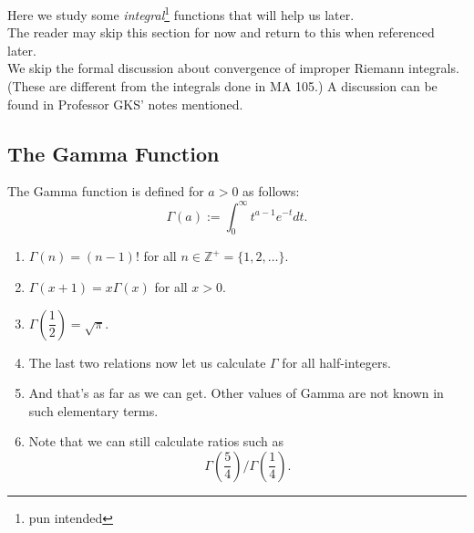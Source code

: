Here we study some \emph{integral}\footnote{pun intended} functions that will help us later.\\
The reader may skip this section for now and return to this when referenced later.\\
We skip the formal discussion about convergence of improper Riemann integrals. (These are different from the integrals done in MA 105.) A discussion can be found in Professor GKS' notes mentioned.
\subsection{The Gamma Function}
\begin{defn}
	The Gamma function is defined for $a > 0$ as follows:
	\begin{equation*} 
		\Gamma(a) := \int_{0}^{\infty} t^{a-1}e^{-t} dt.
	\end{equation*}
\end{defn}
\begin{mdframed}[style=boxstyle, frametitle={Some results}]
	\begin{enumerate}[leftmargin=*]
		\item $\Gamma(n) = (n - 1)!$ for all $n \in \mathbb{Z}^+ = \{1, 2, \ldots\}.$
		\item $\Gamma(x+1) = x\Gamma(x)$ for all $x > 0.$
		\item $\Gamma\left(\dfrac{1}{2}\right) = \sqrt{\pi}.$
		\item The last two relations now let us calculate $\Gamma$ for all half-integers.
		\item And that's as far as we can get. Other values of Gamma are not known in such elementary terms. 
		\item Note that we can still calculate ratios such as
		\begin{equation*} 
			\Gamma\left(\dfrac{5}{4}\right)\bigg/\Gamma\left(\dfrac{1}{4}\right).
		\end{equation*}
	\end{enumerate}
\end{mdframed}

